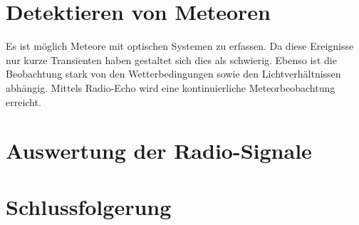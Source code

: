 \begin{refsection}
\section{Detektieren von Meteoren}

Es ist möglich Meteore mit optischen Systemen zu erfassen. 
Da diese Ereignisse nur kurze Transienten haben gestaltet sich dies als schwierig.
Ebenso ist die Beobachtung stark von den Wetterbedingungen sowie den Lichtverhältnissen abhängig.
Mittels Radio-Echo wird eine kontinuierliche Meteorbeobachtung erreicht. 

\section{Auswertung der Radio-Signale}

\section{Schlussfolgerung}

\printbibliography[heading=subbibliography]
\end{refsection}
